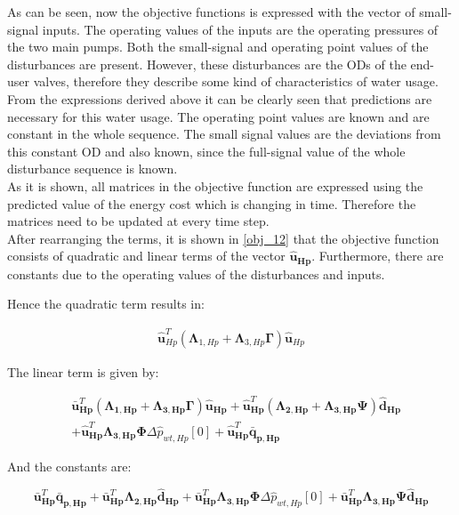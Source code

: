 As can be seen, now the objective functions is expressed with the vector of small-signal inputs. The operating values of the inputs are the operating pressures of the two main pumps. Both the small-signal and operating point values of the disturbances are present. However, these disturbances are the ODs of the end-user valves, therefore they describe some kind of characteristics of water usage. From the expressions derived above it can be clearly seen that predictions are necessary for this water usage. The operating point values are known and are constant in the whole sequence. The small signal values are the deviations from this constant OD and also known, since the full-signal value of the whole disturbance sequence is known. 
\\
As it is shown, all matrices in the objective function are expressed using the predicted value of the energy cost which is changing in time. Therefore the matrices need to be updated at every time step. 
\\
After rearranging the terms, it is shown in \eqref{obj_12} that the objective function consists of quadratic and linear terms of the vector $\bm{\hat{u}_{Hp}}$. Furthermore, there are constants due to the operating values of the disturbances and inputs. 

Hence the quadratic term results in:

\begin{equation}
  \begin{split}
   \bm{\hat{u}}_{Hp}^{T}(\bm{\Lambda}_{1,Hp} + \bm{\Lambda}_{3,Hp} \bm{\Gamma} ) \bm{\hat{u}}_{Hp}
  \end{split}
\end{equation}

The linear term is given by: 

\begin{equation}
  \begin{split}
    & \bm{\bar{u}}_{\bm{Hp}}^{T}(\bm{\Lambda}_{\bm{1,Hp}} + \bm{\Lambda}_{\bm{3,Hp}} \bm{\Gamma} ) \bm{\hat{u}}_{\bm{Hp}} + \bm{\hat{u}}_{\bm{Hp}}^{T}(\bm{\Lambda}_{\bm{2,Hp}} + \bm{\Lambda}_{\bm{3,Hp}} \bm{\Psi} ) \bm{\hat{d}}_{\bm{Hp}}
    \\
    & + \bm{\hat{u}}_{\bm{Hp}}^{T}\bm{\Lambda}_{\bm{3,Hp}} \bm{\Phi} \Delta \hat{p}_{wt,Hp}[0] + \bm{\hat{u}}_{\bm{Hp}}^{T} \bm{\bar{q}}_{\bm{p,Hp}}
  \end{split}
\end{equation}

And the constants are:

\begin{equation}
    \bm{\bar{u}}_{\bm{Hp}}^{T}\bm{\bar{q}}_{\bm{p,Hp}}  + \bm{\bar{u}}_{\bm{Hp}}^{T}\bm{\Lambda}_{\bm{2,Hp}}\bm{\hat{d}}_{\bm{Hp}} + \bm{\bar{u}}_{\bm{Hp}}^{T}\bm{\Lambda}_{\bm{3,Hp}}\bm{\Phi} \Delta \hat{p}_{wt,Hp}[0] + \bm{\bar{u}}_{\bm{Hp}}^{T}\bm{\Lambda}_{\bm{3,Hp}}\bm{\Psi}\bm{\hat{d}}_{\bm{Hp}}
\end{equation}

